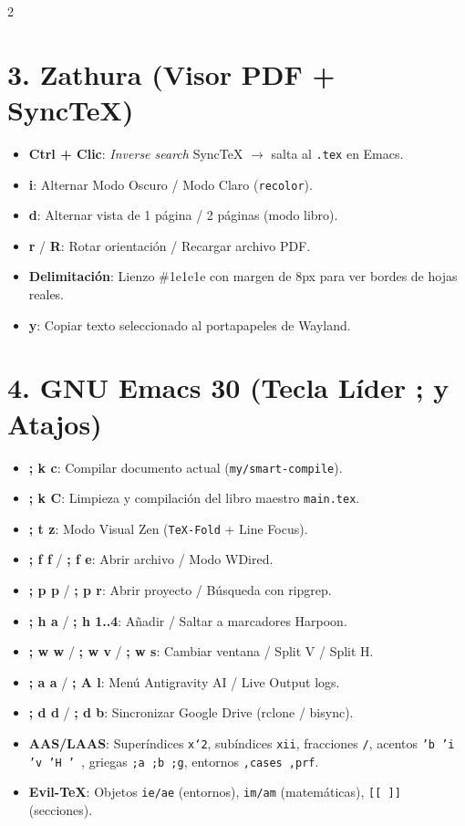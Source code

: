 \documentclass[article,spanish]{apuntes-scr}
\begin{document}
\begin{multicols*}{2}
  \section*{3. Zathura (Visor PDF + SyncTeX)}
  \begin{itemize}[leftmargin=*]
    \item \textbf{Ctrl + Clic}: \textit{Inverse search} SyncTeX $\to$ salta al \texttt{.tex} en Emacs.
    \item \textbf{i}: Alternar Modo Oscuro / Modo Claro (\texttt{recolor}).
    \item \textbf{d}: Alternar vista de 1 página / 2 páginas (modo libro).
    \item \textbf{r} / \textbf{R}: Rotar orientación / Recargar archivo PDF.
    \item \textbf{Delimitación}: Lienzo \#1e1e1e con margen de 8px para ver bordes de hojas reales.
    \item \textbf{y}: Copiar texto seleccionado al portapapeles de Wayland.
  \end{itemize}

  \section*{4. GNU Emacs 30 (Tecla Líder ; y Atajos)}
  \begin{itemize}[leftmargin=*]
    \item \textbf{; k c}: Compilar documento actual (\texttt{my/smart-compile}).
    \item \textbf{; k C}: Limpieza y compilación del libro maestro \texttt{main.tex}.
    \item \textbf{; t z}: Modo Visual Zen (\texttt{TeX-Fold} + Line Focus).
    \item \textbf{; f f} / \textbf{; f e}: Abrir archivo / Modo WDired.
    \item \textbf{; p p} / \textbf{; p r}: Abrir proyecto / Búsqueda con ripgrep.
    \item \textbf{; h a} / \textbf{; h 1..4}: Añadir / Saltar a marcadores Harpoon.
    \item \textbf{; w w} / \textbf{; w v} / \textbf{; w s}: Cambiar ventana / Split V / Split H.
    \item \textbf{; a a} / \textbf{; A l}: Menú Antigravity AI / Live Output logs.
    \item \textbf{; d d} / \textbf{; d b}: Sincronizar Google Drive (rclone / bisync).
    \item \textbf{AAS/LAAS}: Superíndices \texttt{x`2}, subíndices \texttt{xii}, fracciones \texttt{/}, acentos \texttt{'b 'i 'v 'H '~}, griegas \texttt{;a ;b ;g}, entornos \texttt{,cases ,prf}.
    \item \textbf{Evil-TeX}: Objetos \texttt{ie/ae} (entornos), \texttt{im/am} (matemáticas), \texttt{[[ ]]} (secciones).
  \end{itemize}


\end{multicols*}
\end{document}
